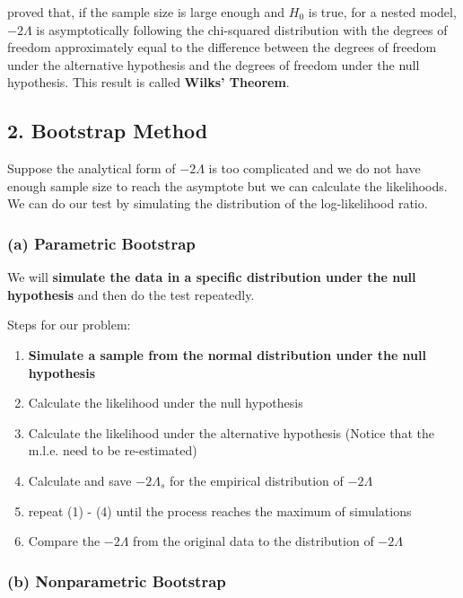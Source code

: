\documentclass[12pt]{article}
\begin{document}
\citet{wilks1938large} proved that, if the sample size is large enough
and \(H_0\) is true, for a nested model, \(-2\Lambda\) is asymptotically
following the chi-squared distribution with the degrees of freedom
approximately equal to the difference between the degrees of freedom
under the alternative hypothesis and the degrees of freedom under the
null hypothesis. This result is called \textbf{Wilks' Theorem}.

\hypertarget{bootstrap-method}{%
\subsection{2. Bootstrap Method}\label{bootstrap-method}}

Suppose the analytical form of \(-2\Lambda\) is too complicated and we
do not have enough sample size to reach the asymptote but we can
calculate the likelihoods. We can do our test by simulating the
distribution of the log-likelihood ratio.

\hypertarget{a-parametric-bootstrap}{%
\subsubsection{(a) Parametric Bootstrap}\label{a-parametric-bootstrap}}

We will \textbf{simulate the data in a specific distribution under the
null hypothesis} and then do the test repeatedly.

Steps for our problem:

\begin{enumerate}
\def\labelenumi{\roman{enumi}.}
\tightlist
\item
  \textbf{Simulate a sample from the normal distribution under the null
  hypothesis}
\item
  Calculate the likelihood under the null hypothesis
\item
  Calculate the likelihood under the alternative hypothesis (Notice that
  the m.l.e. need to be re-estimated)
\item
  Calculate and save \(-2\Lambda_s\) for the empirical distribution of
  \(-2\Lambda\)
\item
  repeat (1) - (4) until the process reaches the maximum of simulations
\item
  Compare the \(-2\Lambda\) from the original data to the distribution
  of \(-2\Lambda\)
\end{enumerate}

\hypertarget{b-nonparametric-bootstrap}{%
\subsubsection{(b) Nonparametric
Bootstrap}\label{b-nonparametric-bootstrap}}
\end{document}
